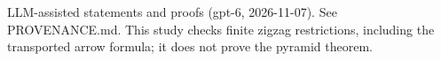 \documentclass[11pt]{article}
\begin{document}

\bigskip
{\footnotesize LLM-assisted statements and proofs (gpt-6, 2026-11-07).
See PROVENANCE.md. This study checks finite zigzag restrictions,
including the transported arrow formula; it does not prove the pyramid theorem.}
\end{document}
